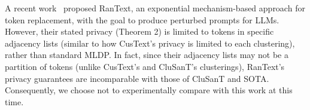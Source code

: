 \documentclass[11pt]{article}
\newcommand{\clusant}{CluSanT\xspace}
\begin{document}



A recent work~\cite{tong2023privinfer} proposed RanText, an exponential mechanism-based approach for token replacement, with the goal to produce perturbed prompts for LLMs. 
However, their stated privacy (Theorem 2) is limited to tokens in specific adjacency lists (similar to how CusText's privacy is limited to each clustering), rather than standard MLDP. In fact, since their adjacency lists may not be a partition of tokens (unlike CusText's and \clusant's clusterings), RanText's privacy guarantees are incomparable with those of \clusant and SOTA.   %
Consequently, we choose not to experimentally compare with this work at this time.
%
\end{document}
